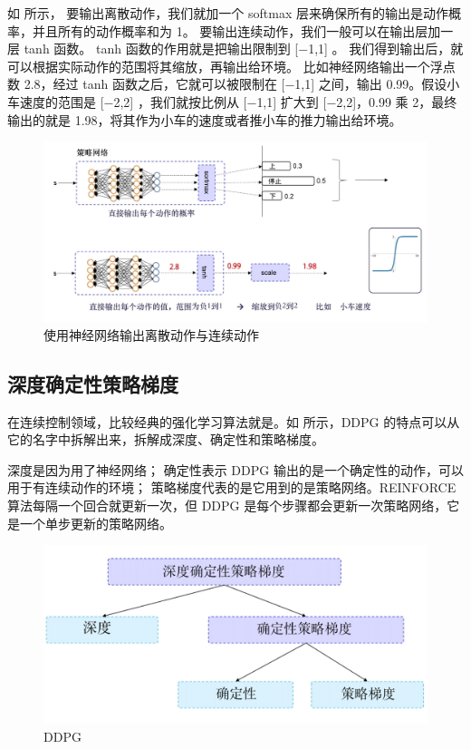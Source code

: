 如 所示，
要输出离散动作，我们就加一个 softmax 层来确保所有的输出是动作概率，并且所有的动作概率和为 1。
要输出连续动作，我们一般可以在输出层加一层 tanh 函数。
tanh 函数的作用就是把输出限制到 [$-$1,1] 。
我们得到输出后，就可以根据实际动作的范围将其缩放，再输出给环境。
比如神经网络输出一个浮点数 2.8，经过 tanh 函数之后，它就可以被限制在 [$-$1,1] 之间，输出 0.99。假设小车速度的范围是 [$-$2,2] ，我们就按比例从 [$-$1,1] 扩大到 [$-$2,2]，0.99 乘 2，最终输出的就是 1.98，将其作为小车的速度或者推小车的推力输出给环境。

\begin{figure}[htb]
  \centering
  \includegraphics[width=0.7\linewidth]{res/ch12/12.3}
  \caption{使用神经网络输出离散动作与连续动作}
  \label{fig:fig12.3}
\end{figure}

\subsection{深度确定性策略梯度} 

在连续控制领域，比较经典的强化学习算法就是。如 所示，DDPG 的特点可以从它的名字中拆解出来，拆解成深度、确定性和策略梯度。

深度是因为用了神经网络；
确定性表示 DDPG 输出的是一个确定性的动作，可以用于有连续动作的环境；
策略梯度代表的是它用到的是策略网络。REINFORCE 算法每隔一个回合就更新一次，但 DDPG 是每个步骤都会更新一次策略网络，它是一个单步更新的策略网络。

\begin{figure}[hbt]
  \centering
  \includegraphics[width=0.5\linewidth]{res/ch12/12.4}
  \caption{DDPG}
  \label{fig:fig12.4}
\end{figure}



